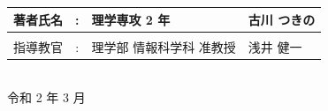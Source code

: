 \begin{titlepage}
\begin{center}
  {\LARGE
    \begin{tabular}{@{}lcl@{\quad}l}
      著者氏名 & : & 理学専攻 2 年 & 古川 つきの\\[-1mm] \hline \\[-5mm]
      指導教官 & : & 理学部 情報科学科 准教授  & 浅井 健一\\[-1mm] \hline
    \end{tabular}
  }\\
  \vspace*{18mm}
  {\LARGE 令和 2 年 3 月}
\end{center}

\end{titlepage}
